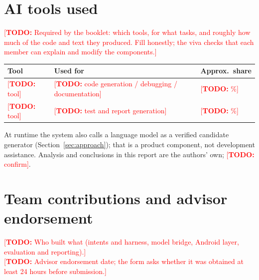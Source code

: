 \documentclass[11pt,a4paper]{article}
\newcommand{\todo}[1]{\textcolor{red}{[\textbf{TODO:} #1]}}
\begin{document}
\section{AI tools used}
\todo{Required by the booklet: which tools, for what tasks, and roughly how much of the code and text they produced. Fill honestly; the viva checks that each member can explain and modify the components.}
\begin{table}[h]\centering\small
\begin{tabularx}{\textwidth}{@{}l X l@{}}
\toprule
Tool & Used for & Approx.\ share\\\midrule
\todo{tool} & \todo{code generation / debugging / documentation} & \todo{\%}\\
\todo{tool} & \todo{test and report generation} & \todo{\%}\\
\bottomrule
\end{tabularx}
\end{table}
At runtime the system also calls a language model as a verified candidate generator (Section~\ref{sec:approach}); that is a product component, not development assistance. Analysis and conclusions in this report are the authors' own; \todo{confirm}.

\section{Team contributions and advisor endorsement}
\todo{Who built what (intents and harness, model bridge, Android layer, evaluation and reporting).}\\
\todo{Advisor endorsement date; the form asks whether it was obtained at least 24 hours before submission.}
\end{document}
